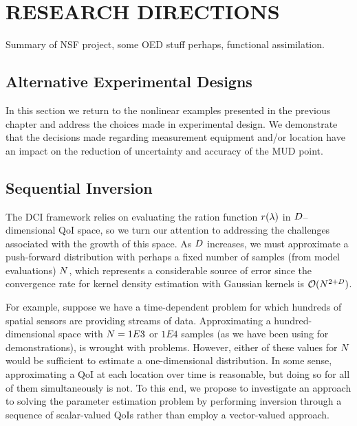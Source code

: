 \chapter{\uppercase{Research Directions} \label{chapter:05}}

Summary of NSF project, some OED stuff perhaps, functional assimilation.

\section{Alternative Experimental Designs}

In this section we return to the nonlinear examples presented in the previous chapter and address the choices made in experimental design.
We demonstrate that the decisions made regarding measurement equipment and/or location have an impact on the reduction of uncertainty and accuracy of the MUD point.


\FloatBarrier

\section{Sequential Inversion}\label{sec:ch05-sequential}

The DCI framework relies on evaluating the ration function $r(\lambda)$ in $D$--dimensional QoI space, so we turn our attention to addressing the challenges associated with the growth of this space.
As $D$ increases, we must approximate a push-forward distribution with perhaps a fixed number of samples (from model evaluations) $N$, which represents a considerable source of error since the convergence rate for kernel density estimation with Gaussian kernels is $\mathcal{O} (N^{2+D})$.

For example, suppose we have a time-dependent problem for which hundreds of spatial sensors are providing streams of data.
Approximating a hundred-dimensional space with $N = 1E3$ or $1E4$ samples (as we have been using for demonstrations), is wrought with problems.
However, either of these values for $N$ would be sufficient to estimate a one-dimensional distribution.
In some sense, approximating a QoI at each location over time is reasonable, but doing so for all of them simultaneously is not.
To this end, we propose to investigate an approach to solving the parameter estimation problem by performing inversion through a sequence of scalar-valued QoIs rather than employ a vector-valued approach.


